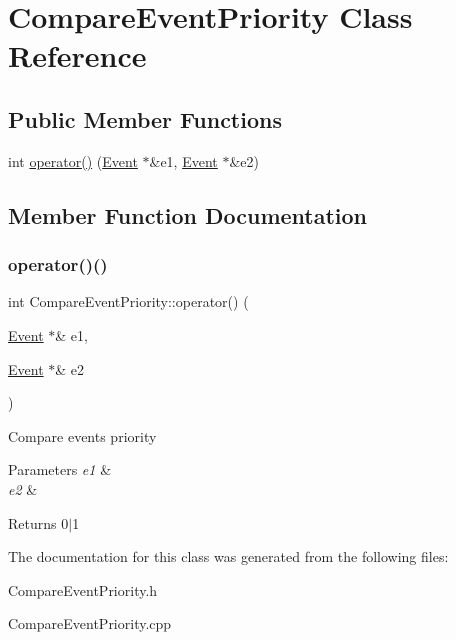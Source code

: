 \hypertarget{classCompareEventPriority}{}\section{Compare\+Event\+Priority Class Reference}
\label{classCompareEventPriority}
\subsection*{Public Member Functions}
\begin{DoxyCompactItemize}
\item 
int \hyperlink{classCompareEventPriority_af585ca697c51d4bef28759b93c2e437e}{operator()} (\hyperlink{classEvent}{Event} $\ast$\&e1, \hyperlink{classEvent}{Event} $\ast$\&e2)
\end{DoxyCompactItemize}


\subsection{Member Function Documentation}
\mbox{\label{classCompareEventPriority_af585ca697c51d4bef28759b93c2e437e}} 
\subsubsection{\texorpdfstring{operator()()}{operator()()}}
{\footnotesize\ttfamily int Compare\+Event\+Priority\+::operator() (\begin{DoxyParamCaption}\item[{\hyperlink{classEvent}{Event} $\ast$\&}]{e1,  }\item[{\hyperlink{classEvent}{Event} $\ast$\&}]{e2 }\end{DoxyParamCaption})}

Compare events priority 
\begin{DoxyParams}{Parameters}
{\em e1} & \\
\hline
{\em e2} & \\
\hline
\end{DoxyParams}
\begin{DoxyReturn}{Returns}
0$\vert$1 
\end{DoxyReturn}


The documentation for this class was generated from the following files\+:\begin{DoxyCompactItemize}
\item 
Compare\+Event\+Priority.\+h\item 
Compare\+Event\+Priority.\+cpp\end{DoxyCompactItemize}
